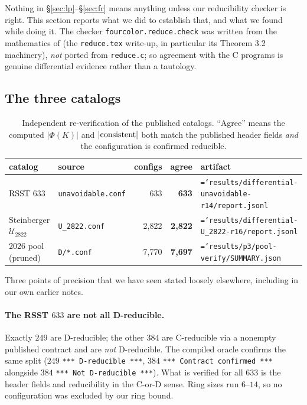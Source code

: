\documentclass[11pt]{article}
\theoremstyle{definition}
\newcommand{\art}[1]{{\texttt{\hyphenchar\font=`\-\relax #1}}}
\begin{document}
Nothing in \S\ref{sec:lp}--\S\ref{sec:fr} means anything unless our reducibility
checker is right. This section reports what we did to establish that, and what we
found while doing it. The checker \texttt{fourcolor.reduce.check} was written from
the mathematics of \cite{rsst-reduce} (the \texttt{reduce.tex} write-up, in
particular its Theorem 3.2 machinery), \emph{not} ported from \texttt{reduce.c}; so
agreement with the C programs is genuine differential evidence rather than a
tautology.

\subsection{The three catalogs}

\begin{table}[h]
\centering\small
\caption{Independent re-verification of the published catalogs. ``Agree'' means the
computed $|\Phi(K)|$ and $|{\rm consistent}|$ both match the published header fields
\emph{and} the configuration is confirmed reducible.}
\label{tab:catalogs}
\begin{tabular}{llrrl}
\toprule
catalog & source & configs & agree & artifact \\
\midrule
RSST $633$ & \cite{rsst-reduce} \texttt{unavoidable.conf} & 633 & \textbf{633} &
  \art{results/differential-unavoidable-r14/report.jsonl} \\
Steinberger $\mathcal{U}_{2822}$ & \cite{steinberger2010} \texttt{U\_2822.conf} & 2{,}822 & \textbf{2{,}822} &
  \art{results/differential-U\_2822-r16/report.jsonl} \\
2026 pool (pruned) & \cite{nl4ct2026} \texttt{D/*.conf} & 7{,}770 & \textbf{7{,}697} &
  \art{results/p3/pool-verify/SUMMARY.json} \\
\bottomrule
\end{tabular}
\end{table}

Three points of precision that we have seen stated loosely elsewhere, including in
our own earlier notes.

\paragraph{The RSST $633$ are not all D-reducible.} Exactly $249$ are D-reducible;
the other $384$ are C-reducible via a nonempty published contract and are
\emph{not} D-reducible. The compiled oracle confirms the same split
($249$ \texttt{*** D-reducible ***}, $384$ \texttt{*** Contract confirmed ***}
alongside $384$ \texttt{*** Not D-reducible ***}). What is verified for all $633$ is
the header fields and reducibility in the C-or-D sense. Ring sizes run $6$--$14$,
so no configuration was excluded by our ring bound.
\end{document}
